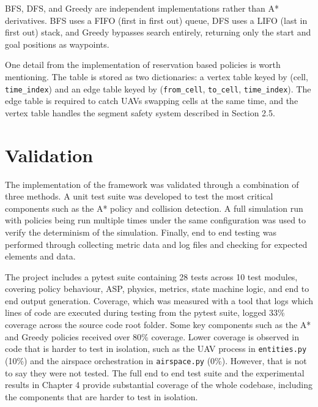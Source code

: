 \vspace{1em}

BFS, DFS, and Greedy are independent implementations rather than A* derivatives. BFS uses a FIFO (first in first out) queue, DFS uses a LIFO (last in first out) stack, and Greedy bypasses search entirely, returning only the start and goal positions as waypoints.\par

\vspace{1em}

One detail from the implementation of reservation based policies is worth mentioning. The table is stored as two dictionaries: a vertex table keyed by (cell, \texttt{time\_index}) and an edge table keyed by (\texttt{from\_cell}, \texttt{to\_cell}, \texttt{time\_index}). The edge table is required to catch UAVs swapping cells at the same time, and the vertex table handles the segment safety system described in Section 2.5. \par

\vspace{1em}

\section{Validation}

The implementation of the framework was validated through a combination of three methods. A unit test suite was developed to test the most critical components such as the A* policy and collision detection. A full simulation run with policies being run multiple times under the same configuration was used to verify the determinism of the simulation. Finally, end to end testing was performed through collecting metric data and log files and checking for expected elements and data. \par

\vspace{1em}

The project includes a pytest suite containing 28 tests across 10 test modules, covering policy behaviour, ASP, physics, metrics, state machine logic, and end to end output generation. Coverage, which was measured with a tool that logs which lines of code are executed during testing from the pytest suite, logged 33\% coverage across the source code root folder. Some key components such as the A* and Greedy policies received over 80\% coverage. Lower coverage is observed in code that is harder to test in isolation, such as the UAV process in \texttt{entities.py} (10\%) and the airspace orchestration in \texttt{airspace.py} (0\%). However, that is not to say they were not tested. The full end to end test suite and the experimental results in Chapter 4 provide substantial coverage of the whole codebase, including the components that are harder to test in isolation. \par

